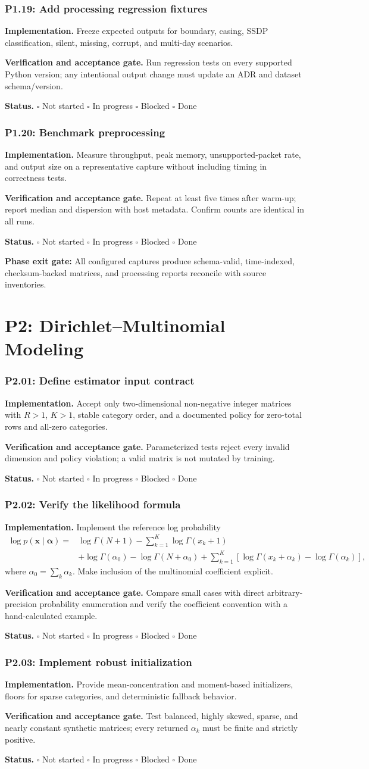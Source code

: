 \documentclass[11pt,a4paper]{article}
\newcommand{\status}{\(\square\) Not started \quad \(\square\) In progress \quad \(\square\) Blocked \quad \(\square\) Done}
\newcommand{\task}[4]{%
  \subsubsection{#1: #2}
  \textbf{Implementation.} #3

  \textbf{Verification and acceptance gate.} #4

  \textbf{Status.} \status
}
\newcommand{\gate}[1]{\textcolor{blue!45!black}{\textbf{Phase exit gate:} #1}}
\begin{document}
\task{P1.19}{Add processing regression fixtures}{Freeze expected outputs for boundary, casing, SSDP classification, silent, missing, corrupt, and multi-day scenarios.}{Run regression tests on every supported Python version; any intentional output change must update an ADR and dataset schema/version.}

\task{P1.20}{Benchmark preprocessing}{Measure throughput, peak memory, unsupported-packet rate, and output size on a representative capture without including timing in correctness tests.}{Repeat at least five times after warm-up; report median and dispersion with host metadata. Confirm counts are identical in all runs.}

\gate{All configured captures produce schema-valid, time-indexed, checksum-backed matrices, and processing reports reconcile with source inventories.}

\section{P2: Dirichlet--Multinomial Modeling}

\task{P2.01}{Define estimator input contract}{Accept only two-dimensional non-negative integer matrices with \(R>1\), \(K>1\), stable category order, and a documented policy for zero-total rows and all-zero categories.}{Parameterized tests reject every invalid dimension and policy violation; a valid matrix is not mutated by training.}

\task{P2.02}{Verify the likelihood formula}{Implement the reference log probability
\begin{align}
\log p(\mathbf{x}\mid\boldsymbol{\alpha})={}&
\log\Gamma(N+1)-\sum_{k=1}^{K}\log\Gamma(x_k+1)\\
&+\log\Gamma(\alpha_0)-\log\Gamma(N+\alpha_0)
+\sum_{k=1}^{K}\left[\log\Gamma(x_k+\alpha_k)-\log\Gamma(\alpha_k)\right],
\end{align}
where \(\alpha_0=\sum_k\alpha_k\). Make inclusion of the multinomial coefficient explicit.}{Compare small cases with direct arbitrary-precision probability enumeration and verify the coefficient convention with a hand-calculated example.}

\task{P2.03}{Implement robust initialization}{Provide mean-concentration and moment-based initializers, floors for sparse categories, and deterministic fallback behavior.}{Test balanced, highly skewed, sparse, and nearly constant synthetic matrices; every returned \(\alpha_k\) must be finite and strictly positive.}
\end{document}
